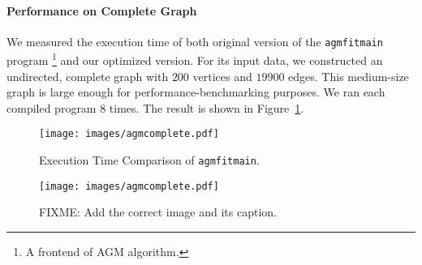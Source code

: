 \paragraph{Performance on Complete Graph} We measured the execution time of 
both original version of the \texttt{agmfitmain} program
\footnote{A frontend of AGM algorithm. }
 and our optimized version. For its input data, we constructed an undirected,
complete graph with $200$ vertices and $19900$ edges. This medium-size graph 
is large enough  for performance-benchmarking purposes.
We ran each compiled program $8$ times.
The result is shown in Figure~\ref{fig:agmcomplete}.

\begin{figure*}[ht]
    \centering
    \begin{subfigure}[b]{0.45\textwidth}
        \texttt{[image: images/agmcomplete.pdf]}
        \caption{Execution Time Comparison of \texttt{agmfitmain}. }
        \label{fig:agmcomplete}
    \end{subfigure}
    \begin{subfigure}[b]{0.45\textwidth}
        \texttt{[image: images/agmcomplete.pdf]}
        \caption{FIXME:  Add the correct image and its caption.}
    \end{subfigure}
\end{figure*}


